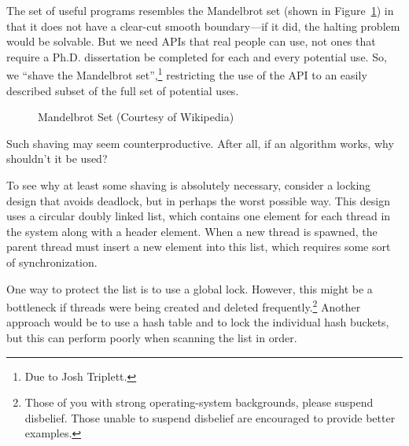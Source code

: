 The set of useful programs resembles the Mandelbrot set
(shown in Figure~\ref{fig:easy:Mandelbrot Set})
in that it does
not have a clear-cut smooth boundary---if it did, the halting problem
would be solvable.
But we need APIs that real people can use, not ones that require a
Ph.D. dissertation be completed for each and every potential use.
So, we ``shave the Mandelbrot set'',\footnote{
	Due to Josh Triplett.}
restricting the use of the
API to an easily described subset of the full set of potential uses.

\begin{figure}[tbp]
\centering
{}
\caption{Mandelbrot Set (Courtesy of Wikipedia)}
\label{fig:easy:Mandelbrot Set}
\end{figure}

Such shaving may seem counterproductive.
After all, if an algorithm works, why shouldn't it be used?

To see why at least some shaving is absolutely necessary, consider
a locking design that avoids deadlock, but in perhaps the worst possible way.
This design uses a circular doubly linked list, which contains one
element for each thread in the system along with a header element.
When a new thread is spawned, the parent thread must insert a new
element into this list, which requires some sort of synchronization.

One way to protect the list is to use a global lock.
However, this might be a bottleneck if threads were being created and
deleted frequently.\footnote{
	Those of you with strong operating-system backgrounds, please
	suspend disbelief.
	Those unable to suspend disbelief are encouraged to provide
	better examples.}
Another approach would be to use a hash table and to lock the individual
hash buckets, but this can perform poorly when scanning the list in order.

